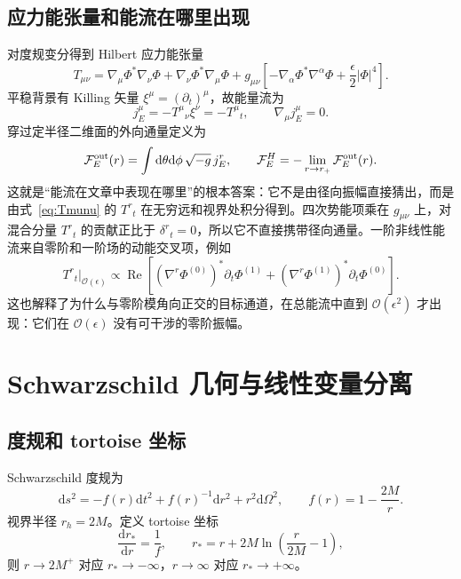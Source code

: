 \documentclass[UTF8,fontset=fandol,11pt,a4paper,oneside]{ctexart}
\numberwithin{equation}{section}
\newcommand{\dd}{\mathrm d}
\newcommand{\cO}{\mathcal O}
\newcommand{\cF}{\mathcal F}
\newcommand{\abs}[1]{\left|#1\right|}
\newcommand{\Ree}{\operatorname{Re}}
\begin{document}
\subsection{应力能张量和能流在哪里出现}

对度规变分得到 Hilbert 应力能张量
\begin{equation}
T_{\mu\nu}=
\nabla_\mu\Phi^*\nabla_\nu\Phi+
\nabla_\nu\Phi^*\nabla_\mu\Phi
+g_{\mu\nu}\left[-\nabla_\alpha\Phi^*\nabla^\alpha\Phi
+\frac{\epsilon}{2}\abs{\Phi}^4\right].
\label{eq:Tmunu}
\end{equation}
平稳背景有 Killing 矢量 $\xi^\mu=(\partial_t)^\mu$，故能量流为
\begin{equation}
j_E^\mu=-T^\mu{}_{\nu}\xi^\nu=-T^\mu{}_t,
\qquad \nabla_\mu j_E^\mu=0.
\end{equation}
穿过定半径二维面的外向通量定义为
\begin{equation}
\cF_E^{\rm out}(r)=\int\dd\theta\dd\phi\,\sqrt{-g}\,j_E^r,
\qquad
\cF_E^H=-\lim_{r\to r_+}\cF_E^{\rm out}(r).
\label{eq:flux-def}
\end{equation}
这就是“能流在文章中表现在哪里”的根本答案：它不是由径向振幅直接猜出，而是由式~\eqref{eq:Tmunu} 的 $T^r{}_t$ 在无穷远和视界处积分得到。四次势能项乘在 $g_{\mu\nu}$ 上，对混合分量 $T^r{}_t$ 的贡献正比于 $\delta^r{}_t=0$，所以它不直接携带径向通量。一阶非线性能流来自零阶和一阶场的动能交叉项，例如
\begin{equation}
T^r{}_{t}\big|_{\cO(\epsilon)}
\propto \Ree\left[
(\nabla^r\Phi^{(0)})^*\partial_t\Phi^{(1)}
+(\nabla^r\Phi^{(1)})^*\partial_t\Phi^{(0)}
\right].
\label{eq:flux-interference}
\end{equation}
这也解释了为什么与零阶模角向正交的目标通道，在总能流中直到 $\cO(\epsilon^2)$ 才出现：它们在 $\cO(\epsilon)$ 没有可干涉的零阶振幅。


\section{Schwarzschild 几何与线性变量分离}
\label{sec:sch-linear}

\subsection{度规和 tortoise 坐标}

Schwarzschild 度规为
\begin{equation}
\dd s^2=-f(r)\dd t^2+f(r)^{-1}\dd r^2+r^2\dd\Omega^2,
\qquad f(r)=1-\frac{2M}{r}.
\end{equation}
视界半径 $r_h=2M$。定义 tortoise 坐标
\begin{equation}
\frac{\dd r_*}{\dd r}=\frac{1}{f},\qquad
r_*=r+2M\ln\left(\frac{r}{2M}-1\right),
\end{equation}
则 $r\to2M^+$ 对应 $r_*\to-\infty$，$r\to\infty$ 对应 $r_*\to+\infty$。
\end{document}
